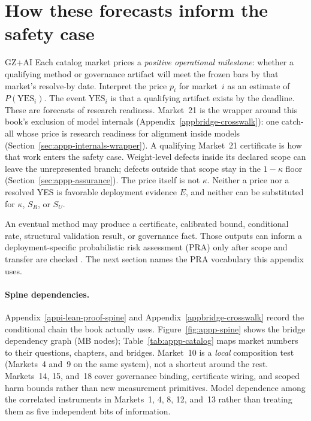 \section{How these forecasts inform the safety case}
\label{sec:appp-aggregation}
\begin{authbar}{GZ+AI}
Each catalog market prices a \emph{positive operational milestone}: whether a qualifying method or governance artifact will meet the frozen bars by that market's resolve-by date.
Interpret the price $p_i$ for market~$i$ as an estimate of $P(\mathrm{YES}_i)$.
The event $\mathrm{YES}_i$ is that a qualifying artifact exists by the deadline.
These are forecasts of research readiness.
Market~21 is the wrapper around this book's exclusion of model internals (Appendix~\ref{appbridge-crosswalk}): one catch-all whose price is research readiness for alignment inside models (Section~\ref{sec:appp-internals-wrapper}).
A qualifying Market~21 certificate is how that work enters the safety case.
Weight-level defects inside its declared scope can leave the unrepresented branch; defects outside that scope stay in the $1-\kappa$ floor (Section~\ref{sec:appp-assurance}).
The price itself is not $\kappa$.
Neither a price nor a resolved YES is favorable deployment evidence $E$, and neither can be substituted for $\kappa$, $S_R$, or $S_U$.

An eventual method may produce a certificate, calibrated bound, conditional rate, structural validation result, or governance fact.
Those outputs can inform a deployment-specific probabilistic risk assessment (PRA) only after scope and transfer are checked \autocite{kaplan1981risk,nrcPRA}.
The next section names the PRA vocabulary this appendix uses.

\paragraph{Spine dependencies.}
Appendix~\ref{appi-lean-proof-spine} and Appendix~\ref{appbridge-crosswalk} record the conditional chain the book actually uses.
Figure~\ref{fig:appp-spine} shows the bridge dependency graph (MB nodes); Table~\ref{tab:appp-catalog} maps market numbers to their questions, chapters, and bridges.
Market~10 is a \emph{local} composition test (Markets~4 and~9 on the same system), not a shortcut around the rest.
Markets~14, 15, and~18 cover governance binding, certificate wiring, and scoped harm bounds rather than new measurement primitives.
Model dependence among the correlated instruments in Markets~1, 4, 8, 12, and~13 rather than treating them as five independent bits of information.

\end{authbar}
